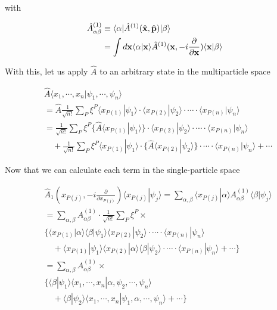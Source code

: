 with

\begin{align}
\begin{split}
\hat{A}^{(1)}_{\alpha\beta} &\equiv\langle\alpha|\hat{A}^{(1)}({\bf \hat{x},\hat{p}})|\beta\rangle \\
&=\int d{\bf x} \langle\alpha|{\bf x}\rangle\hat{A}^{(1)}({\bf x}, -i\frac{\partial}{\partial{\bf x}})\langle{\bf x}|\beta\rangle
\end{split}
\end{align}

With this, let us apply $\hat{A}$ to an arbitrary state in the multiparticle space

\[\begin{split}
&\hat{A}\langle x_1,\cdots,x_n|\psi_1,\cdots,\psi_n\rangle \\
&=\hat{A}\frac{1}{\sqrt{n!}}\sum_P\xi^P\langle x_{P(1)}|\psi_1\rangle\cdot\langle x_{P(2)}|\psi_2\rangle\cdot\cdots\cdot\langle x_{P(n)}|\psi_n\rangle\\
&=\frac{1}{\sqrt{n!}}\sum_P\xi^P\{\hat{A}\langle x_{P(1)}|\psi_1\rangle\}\cdot\langle x_{P(2)}|\psi_2\rangle\cdot\cdots\cdot\langle x_{P(n)}|\psi_n\rangle \\
&\quad + \frac{1}{\sqrt{n!}}\sum_P\xi^P\langle x_{P(1)}|\psi_1\rangle\cdot\{\hat{A}\langle x_{P(2)}|\psi_2\rangle\}\cdot\cdots\cdot\langle x_{P(n)}|\psi_n\rangle + \cdots
\end{split}\]

Now that we can calculate each term in the single-particle space

\[\begin{split}
&\hat{A}_1(x_{P(j)},-i\frac{\partial}{\partial x_{P(j)}})\langle x_{P(j)}|\psi_j\rangle = \sum_{\alpha,\beta}\langle x_{P(j)}|\alpha\rangle A^{(1)}_{\alpha\beta}\langle\beta|\psi_j\rangle \\
&= \sum_{\alpha,\beta}A^{(1)}_{\alpha\beta}\cdot\frac{1}{\sqrt{n!}}\sum_P\xi^P \times \\
&\Big\{\langle x_{P(1)}|\alpha\rangle\langle\beta|\psi_1\rangle\langle x_{P(2)}|\psi_2\rangle\cdot\cdots\cdot\langle x_{P(n)}|\psi_n\rangle\\
&\quad +\langle x_{P(1)}|\psi_1\rangle\langle x_{P(2)}|\alpha\rangle\langle\beta|\psi_2\rangle\cdot\cdots\cdot\langle x_{P(n)}|\psi_n\rangle + \cdots\Big\}\\
&=\sum_{\alpha,\beta}A_{\alpha\beta}^{(1)}\times\\
&\Big\{\langle\beta|\psi_1\rangle\langle x_1,\cdots,x_n|\alpha,\psi_2,\cdots,\psi_n\rangle\\
&\quad +\langle\beta|\psi_2\rangle\langle x_1,\cdots,x_n|\psi_1,\alpha,\cdots,\psi_n\rangle + \cdots\Big\}
\end{split}\]

